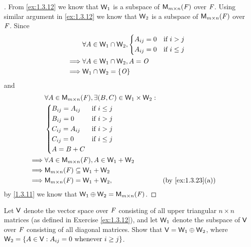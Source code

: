 \begin{proof}[]
  From \cref{ex:1.3.12} we know that \(\mathsf{W}_1\) is a subspace of \(\mathsf{M}_{{m} \times n}({\mathit{F}})\) over \(\mathit{F}\).
  Using similar argument in \cref{ex:1.3.12} we know that \(\mathsf{W}_2\) is a subspace of \(\mathsf{M}_{{m} \times n}({\mathit{F}})\) over \(\mathit{F}\).
  Since
  \begin{align*}
             & \forall A \in \mathsf{W}_1 \cap \mathsf{W}_2, \begin{dcases}
      A_{i j} = 0 & \text{if } i > j    \\
      A_{i j} = 0 & \text{if } i \leq j
    \end{dcases} \\
    \implies & \forall A \in \mathsf{W}_1 \cap \mathsf{W}_2, A = \mathit{O}                    \\
    \implies & \mathsf{W}_1 \cap \mathsf{W}_2 = \left\lbrace\mathit{O}\right\rbrace
  \end{align*}
  and
  \begin{align*}
             & \forall A \in \MS, \exists (B, C) \in \W_1 \times \W_2 :                                      \\
             & \begin{dcases}
      B_{i j} = A_{i j} & \text{if } i \leq j \\
      B_{i j} = 0       & \text{if } i > j    \\
      C_{i j} = A_{i j} & \text{if } i > j    \\
      C_{i j} = 0       & \text{if } i \leq j \\
      A = B + C
    \end{dcases}                                                                    \\
    \implies & \forall A \in \MS, A \in \W_1 + \W_2                                                          \\
    \implies & \MS \subseteq \W_1 + \W_2                                                                     \\
    \implies & \MS = \W_1 + \W_2,                                       &  & \text{(by \cref{ex:1.3.23}(a))}
  \end{align*}
  by \cref{1.3.11} we know that \(\mathsf{W}_1 \oplus \mathsf{W}_2 = \mathsf{M}_{{m} \times n}({\mathit{F}})\).
\end{proof}

\begin{ex}\label{ex:1.3.27}
  Let \(\mathsf{V}\) denote the vector space over \(\mathit{F}\) consisting of all upper triangular \(n \times n\) matrices (as defined in Exercise \cref{ex:1.3.12}), and let \(\mathsf{W}_1\) denote the subspace of \(\mathsf{V}\) over \(\mathit{F}\) consisting of all diagonal matrices.
  Show that \(\mathsf{V} = \mathsf{W}_1 \oplus \mathsf{W}_2\), where \(\mathsf{W}_2 = \left\lbrace A \in \mathsf{V} : A_{i j} = 0 \text{ whenever } i \geq j\right\rbrace\).
\end{ex}

